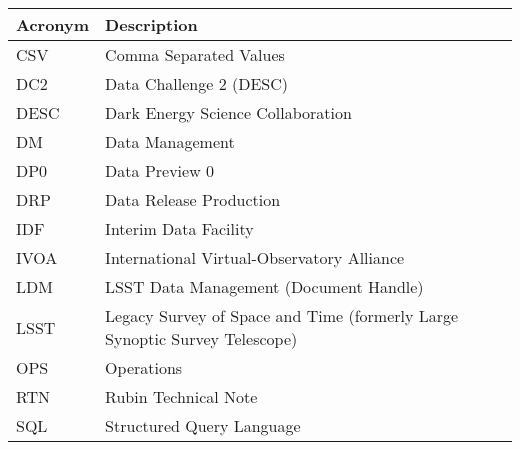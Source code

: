 \addtocounter{table}{-1}
\begin{longtable}{p{}p{}}\hline
\textbf{Acronym} & \textbf{Description}  \\\hline

CSV & Comma Separated Values \\\hline
DC2 & Data Challenge 2 (DESC) \\\hline
DESC & Dark Energy Science Collaboration \\\hline
DM & Data Management \\\hline
DP0 & Data Preview 0 \\\hline
DRP & Data Release Production \\\hline
IDF & Interim Data Facility \\\hline
IVOA & International Virtual-Observatory Alliance \\\hline
LDM & LSST Data Management (Document Handle) \\\hline
LSST & Legacy Survey of Space and Time (formerly Large Synoptic Survey Telescope) \\\hline
OPS & Operations \\\hline
RTN & Rubin Technical Note \\\hline
SQL & Structured Query Language \\\hline
\end{longtable}
